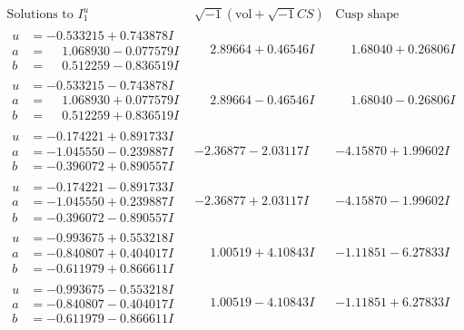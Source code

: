 \documentclass[1p]{elsarticle_modified}
\theoremstyle{definition}
\newcommand{\I}{\sqrt{-1}}
\begin{document}
$$\begin{array}{c|c|c}  
\text{Solutions to }I^u_{1}& \I (\text{vol} + \sqrt{-1}CS) & \text{Cusp shape}\\
 \hline 
\begin{aligned}
u &= -0.533215 + 0.743878 I \\
a &= \phantom{-}1.068930 - 0.077579 I \\
b &= \phantom{-}0.512259 - 0.836519 I\end{aligned}
 & \phantom{-}2.89664 + 0.46546 I & \phantom{-}1.68040 + 0.26806 I \\ \hline\begin{aligned}
u &= -0.533215 - 0.743878 I \\
a &= \phantom{-}1.068930 + 0.077579 I \\
b &= \phantom{-}0.512259 + 0.836519 I\end{aligned}
 & \phantom{-}2.89664 - 0.46546 I & \phantom{-}1.68040 - 0.26806 I \\ \hline\begin{aligned}
u &= -0.174221 + 0.891733 I \\
a &= -1.045550 - 0.239887 I \\
b &= -0.396072 + 0.890557 I\end{aligned}
 & -2.36877 - 2.03117 I & -4.15870 + 1.99602 I \\ \hline\begin{aligned}
u &= -0.174221 - 0.891733 I \\
a &= -1.045550 + 0.239887 I \\
b &= -0.396072 - 0.890557 I\end{aligned}
 & -2.36877 + 2.03117 I & -4.15870 - 1.99602 I \\ \hline\begin{aligned}
u &= -0.993675 + 0.553218 I \\
a &= -0.840807 + 0.404017 I \\
b &= -0.611979 + 0.866611 I\end{aligned}
 & \phantom{-}1.00519 + 4.10843 I & -1.11851 - 6.27833 I \\ \hline\begin{aligned}
u &= -0.993675 - 0.553218 I \\
a &= -0.840807 - 0.404017 I \\
b &= -0.611979 - 0.866611 I\end{aligned}
 & \phantom{-}1.00519 - 4.10843 I & -1.11851 + 6.27833 I \\ \hline\begin{aligned}

\end{aligned}
\end{array}$$
\end{document}
